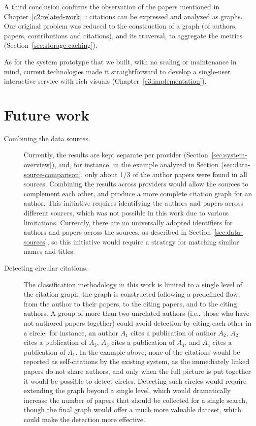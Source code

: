 A third conclusion confirms the observation of the papers mentioned in Chapter~\ref{c2:related-work}~\cite{Boyack2005, Chronis2020, Chronis2021}: citations can be expressed and analyzed as graphs.
Our original problem was reduced to the construction of a graph (of authors, papers, contributions and citations), and its traversal, to aggregate the metrics (Section~\ref{sec:storage-caching}).

As for the system prototype that we built, with no scaling or maintenance in mind, current technologies made it straightforward to develop a single-user interactive service with rich visuals (Chapter~\ref{c3:implementation}).

\section{Future work} \label{sec:future-work}

\begin{description}
\item
[Combining the data sources.] Currently, the results are kept separate per provider (Section~\ref{sec:system-overview}), and, for instance, in the example analyzed in Section~\ref{sec:data-source-comparison}, only about 1/3 of the author papers were found in all sources.
Combining the results across providers would allow the sources to complement each other, and produce a more complete citation graph for an author.
This initiative requires identifying the authors and papers across different sources, which was not possible in this work due to various limitations.
Currently, there are no universally adopted identifiers for authors and papers across the sources, as described in Section~\ref{sec:data-sources}, so this initiative would require a strategy for matching similar names and titles.
\item
[Detecting circular citations.] The classification methodology in this work is limited to a single level of the citation graph: the graph is constructed following a predefined flow, from the author to their papers, to the citing papers, and to the citing authors.
A group of more than two unrelated authors (i.e., those who have not authored papers together) could avoid detection by citing each other in a circle: for instance, an author $A_1$ cites a publication of author $A_2$, $A_2$ cites a publication of $A_3$, $A_3$ cites a publication of $A_4$, and $A_4$ cites a publication of $A_1$.
In the example above, none of the citations would be reported as self-citations by the existing system, as the immediately linked papers do not share authors, and only when the full picture is put together it would be possible to detect circles.
Detecting such circles would require extending the graph beyond a single level, which would dramatically increase the number of papers that should be collected for a single search, though the final graph would offer a much more valuable dataset, which could make the detection more effective.
\end{description}
